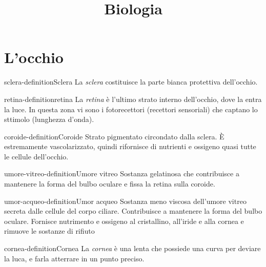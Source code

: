 \documentclass[preview]{standalone}
\begin{document}
\title{Biologia}
\genpage

\section{L'occhio}




\begin{snippetdefinition}{sclera-definition}{Sclera}
    La \textit{sclera} costituisce la parte bianca protettiva dell'occhio.
\end{snippetdefinition}

\begin{snippetdefinition}{retina-definition}{retina}
    La \textit{retina} è l'ultimo strato interno dell'occhio, dove la entra la luce.
    In questa zona vi sono i fotorecettori (recettori sensoriali) che captano lo sttimolo (lunghezza d'onda).
\end{snippetdefinition}

\begin{snippetdefinition}{coroide-definition}{Coroide}
    Strato pigmentato circondato dalla sclera. È estremamente vascolarizzato, quindi rifornisce
    di nutrienti e ossigeno quasi tutte le cellule dell'occhio.
\end{snippetdefinition}

\begin{snippetdefinition}{umore-vitreo-definition}{Umore vitreo}
    Sostanza gelatinosa che contribuisce a mantenere la forma del bulbo oculare e fissa la
    retina sulla coroide.
\end{snippetdefinition}

\begin{snippetdefinition}{umor-acqueo-definition}{Umor acqueo}
    Sostanza meno viscosa dell'umore vitreo secreta dalle cellule del corpo ciliare. Contribuisce
    a mantenere la forma del bulbo oculare. Fornisce nutrimento e ossigeno al cristallino,
    all'iride e alla cornea e rimuove le sostanze di rifiuto
\end{snippetdefinition}

\begin{snippetdefinition}{cornea-definition}{Cornea}
    La \textit{cornea} è una lenta che possiede una curva per deviare la luca, e farla atterrare in un punto preciso.
\end{snippetdefinition}
\end{document}
